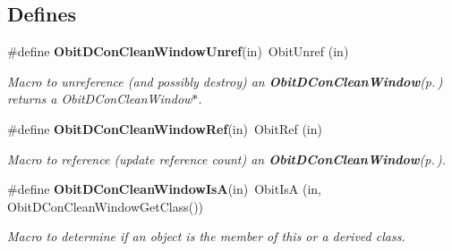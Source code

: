 \subsection*{Defines}
\begin{CompactItemize}
\item 
\#define {\bf Obit\-DCon\-Clean\-Window\-Unref}(in)\ Obit\-Unref (in)
\begin{CompactList}\small\item\em Macro to unreference (and possibly destroy) an {\bf Obit\-DCon\-Clean\-Window}{\rm (p.\,\pageref{structObitDConCleanWindow})} returns a Obit\-DCon\-Clean\-Window$\ast$. \item\end{CompactList}\item 
\#define {\bf Obit\-DCon\-Clean\-Window\-Ref}(in)\ Obit\-Ref (in)
\begin{CompactList}\small\item\em Macro to reference (update reference count) an {\bf Obit\-DCon\-Clean\-Window}{\rm (p.\,\pageref{structObitDConCleanWindow})}. \item\end{CompactList}\item 
\#define {\bf Obit\-DCon\-Clean\-Window\-Is\-A}(in)\ Obit\-Is\-A (in, Obit\-DCon\-Clean\-Window\-Get\-Class())
\begin{CompactList}\small\item\em Macro to determine if an object is the member of this or a derived class. \item\end{CompactList}\end{CompactItemize}
